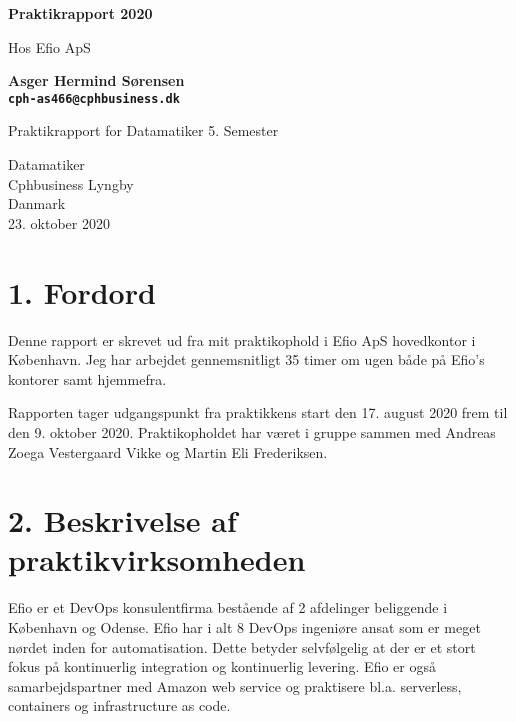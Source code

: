 \documentclass[11pt]{report}
\begin{document}
\begin{titlepage}
  \begin{center}
      \vspace*{1cm}

      \Huge
      \textbf{Praktikrapport 2020}

      \vspace{0.5cm}
      \LARGE
      Hos Efio ApS

      \vspace{1.5cm}

      \textbf{
        Asger Hermind Sørensen\\
        \texttt{cph-as466@cphbusiness.dk}
      }

      \vfill

      Praktikrapport for Datamatiker 5. Semester

      \vspace{0.8cm}

      \Large
      Datamatiker\\
      Cphbusiness Lyngby\\
      Danmark\\
      23. oktober 2020

  \end{center}
\end{titlepage}
\renewcommand{\cftchapleader}{\cftdotfill{\cftdotsep}}
\tableofcontents
\newpage

\chapter*{1. Fordord}
Denne rapport er skrevet ud fra mit praktikophold i Efio ApS hovedkontor i København. 
Jeg har arbejdet gennemsnitligt 35 timer om ugen både på Efio’s kontorer samt hjemmefra.

Rapporten tager udgangspunkt fra praktikkens start den 17. august 2020 frem til den 9. oktober 2020.
Praktikopholdet har været i gruppe sammen med Andreas Zoega Vestergaard Vikke og Martin Eli Frederiksen. 
 

\chapter*{2. Beskrivelse af praktikvirksomheden}
Efio er et DevOps konsulentfirma bestående af 2 afdelinger beliggende i København og Odense.
Efio har i alt 8 DevOps ingeniøre ansat som er meget nørdet inden for automatisation. 
Dette betyder selvfølgelig at der er et stort fokus på kontinuerlig integration og kontinuerlig levering. 
Efio er også samarbejdspartner med Amazon web service og praktisere bl.a. serverless, 
containers og infrastructure as code. 
\end{document}
